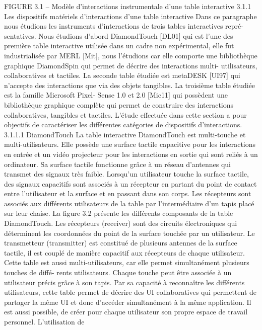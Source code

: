 \documentclass{article}
\begin{document}
 
 
FIGURE 3.1 – Modèle d’interactions instrumentale d’une table interactive
3.1.1
Les dispositifs matériels d’interactions d’une table interactive
Dans ce paragraphe nous étudions les instruments d’interactions de trois tables interactives repré-
sentatives. Nous étudions d’abord DiamondTouch [DL01] qui est l’une des première table interactive
utilisée dans un cadre non expérimental, elle fut industrialisée par MERL [Mit], nous l’étudions car
elle comporte une bibliothèque graphique DiamondSpin qui permet de décrire des interactions multi-
utilisateurs, collaboratives et tactiles. La seconde table étudiée est metaDESK [UI97] qui n’accepte
des interactions que via des objets tangibles. La troisième table étudiée est la famille Microsoft Pixel-
Sense 1.0 et 2.0 [Mic11] qui possèdent une bibliothèque graphique complète qui permet de construire
des interactions collaboratives, tangibles et tactiles.
L’étude effectuée dans cette section a pour objectifs de caractériser les différentes catégories de
dispositifs d’interactions.
3.1.1.1
DiamondTouch
La table interactive DiamondTouch est multi-touche et multi-utilisateurs. Elle possède une surface
tactile capacitive pour les interactions en entrée et un vidéo projecteur pour les interactions en sortie
qui sont reliés à un ordinateur. Sa surface tactile fonctionne grâce à un réseau d’antennes qui transmet
des signaux très faible. Lorsqu’un utilisateur touche la surface tactile, des signaux capacitifs sont
associés à un récepteur en partant du point de contact entre l’utilisateur et la surface et en passant dans
son corps. Les récepteurs sont associés aux différents utilisateurs de la table par l’intermédiaire d’un
tapis placé sur leur chaise. La ﬁgure 3.2 présente les différents composants de la table DiamondTouch.
Les récepteurs (receiver) sont des circuits électroniques qui déterminent les coordonnées du point de
la surface touchée par un utilisateur. Le transmetteur (transmitter) est constitué de plusieurs antennes
de la surface tactile, il est couplé de manière capacitif aux récepteurs de chaque utilisateur.
Cette table est aussi multi-utilisateurs, car elle permet simultanément plusieurs touches de diffé-
rents utilisateurs. Chaque touche peut être associée à un utilisateur précis grâce à son tapis. Par sa
capacité à reconnaître les différents utilisateurs, cette table permet de décrire des UI collaboratives
qui permettent de partager la même UI et donc d’accéder simultanément à la même application. Il est
aussi possible, de créer pour chaque utilisateur son propre espace de travail personnel. L’utilisation de
\end{document}
